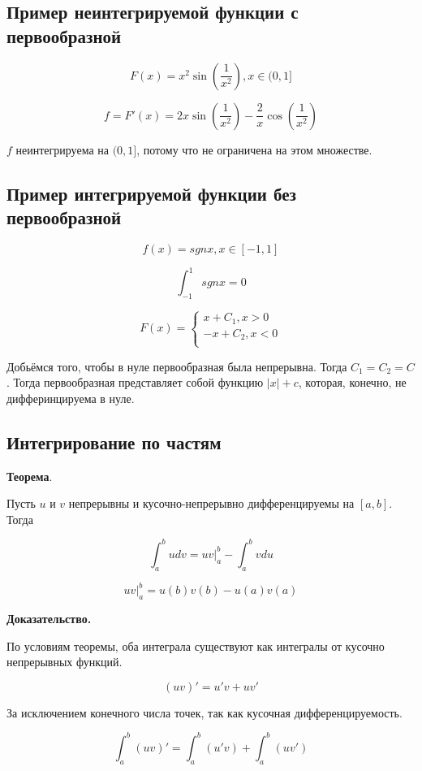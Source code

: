\documentclass[a4paper]{article}
\begin{document}
\begin{definit}
\hypertarget{p14}{}
\subsection*{Пример неинтегрируемой функции с первообразной}

\[
F(x) = x^2 \sin \left( \frac{1}{x^2} \right), x \in (0,1]
\]

\[
f = F'(x) = 2x \sin \left( \frac{1}{x^2} \right) - \frac{2}{x} \cos \left( \frac{1}{x^2} \right)
\]

$f$ неинтегрируема на $(0,1]$, потому что не ограничена на этом множестве.
\end{definit}


\begin{definit}
\hypertarget{p15}{}
\subsection*{Пример интегрируемой функции без первообразной}

\[
f(x) = sgn x, x \in [-1,1]
\]

\[
\int_{-1}^1 sgn x = 0
\]

\[
F(x) = \begin{cases}
x+C_1, x>0\\
-x+C_2, x<0\\
\end{cases}
\]

Добьёмся того, чтобы в нуле первообразная была непрерывна. Тогда $C_1 = C_2 = C$. Тогда первообразная представляет собой функцию $|x|+c$, которая, конечно, не дифферинцируема в нуле.
\end{definit}


\begin{definit}
\hypertarget{p16}{}
\subsection*{Интегрирование по частям}

\begin{htheorem}\textbf{Теорема}.

Пусть $u$ и $v$ непрерывны и кусочно-непрерывно дифференцируемы на $[a,b]$. Тогда

\[
\int_a^b udv = uv |_a^b - \int_a^b vdu
\]

\[
uv |_a^b = u(b)v(b) - u(a)v(a)
\]
\end{htheorem}

\begin{hproof}\textbf{Доказательство.}

По условиям теоремы, оба интеграла существуют как интегралы от кусочно непрерывных функций.

\[
(uv)' = u'v + uv'
\]

За исключением конечного числа точек, так как кусочная дифференцируемость.

\[
\int_a^b (uv)' = \int_a^b (u'v) + \int_a^b (uv')
\]
\end{hproof}
\end{definit}
\end{document}

